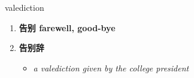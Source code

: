 
\begin{frame}
{\huge valediction}
\begin{center}
\begin{enumerate}\Large
  \item \textbf{告别 farewell, good-bye}
  \item \textbf{告别辞}
  \begin{itemize}
    \item \em{\Large{a valediction given by the college president}}
  \end{itemize}
\end{enumerate}
\end{center}
\end{frame}
